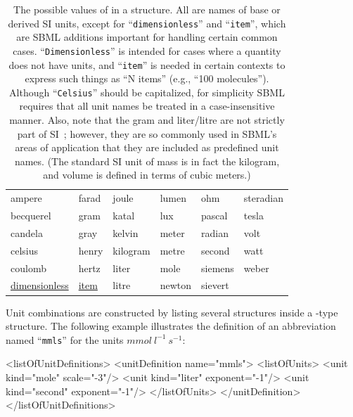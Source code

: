 \documentclass[10pt]{cekarticle}
\newcommand{\changed}[1]{\textcolor{BrickRed}{#1}}
\begin{document}
\begin{table}[thb]
  \centering
  \ttfamily
  \begin{tabular}{llllll}
    \toprule
    ampere      	& farad	& joule		& lumen		& ohm     & steradian\\
    becquerel   	& gram	& katal		& lux		& pascal  & tesla\\
    candela		& gray	& kelvin	& meter		& radian  & volt\\
    celsius		& henry	& kilogram	& metre		& second  & watt\\
    coulomb		& hertz	& liter		& mole		& siemens & weber\\
    \underline{dimensionless} & \underline{item} & litre	& newton	& sievert\\
    \bottomrule
  \end{tabular}
  \caption{The possible values of  in a 
    structure.  All are names of base or derived SI units, except for
    ``\texttt{dimensionless}'' and ``\texttt{item}'', which are 
    SBML additions important for handling certain common cases.
    ``\texttt{Dimensionless}'' is intended for cases where a quantity does not
    have units, and ``\texttt{item}'' is  needed in certain contexts to express
    such things as ``N items'' (e.g., ``100 molecules'').
    \changed{Although ``\texttt{Celsius}'' should be capitalized, for 
    simplicity SBML
    requires that all unit names be treated in a case-insensitive manner.}
    Also, note that the gram and liter/litre are not
    strictly part of SI~\protect\changed{\citep{bipm:2000}}; however, they
    are \changed{so commonly used in SBML's areas of application that they 
    are included as predefined unit names.}  (The standard SI unit of
    mass is in fact the kilogram, and volume is
    defined in terms of cubic meters.)}
  \label{tab:unitkind}
\end{table}

Unit combinations are constructed by listing several 
structures inside a -type structure.  The following
example illustrates the definition of an abbreviation named
``\texttt{mmls}'' for the units $mmol\ l^{-1}\ s^{-1}$:

\begin{example}
<listOfUnitDefinitions>
    <unitDefinition name="mmls">
        <listOfUnits>
            <unit kind="mole"   scale="-3"/>
            <unit kind="liter"  exponent="-1"/>
            <unit kind="second" exponent="-1"/>
        </listOfUnits>                
    </unitDefinition>
</listOfUnitDefinitions>
\end{example}
\end{document}
